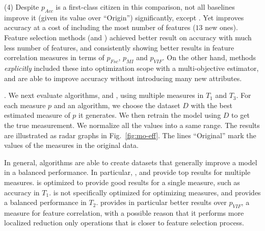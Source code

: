 {\sstab
(4) Despite $p_{Acc}$ is a first-class citizen 
in this comparison, not all baselines improve 
it (given its value over ``Origin'') significantly, except \starmie.   
Yet \starmie improves accuracy at a cost of 
including the most number of 
features ($13$ new ones). Feature selection 
methods (\sklearn and \ho) achieved better 
result on accuracy with much less number of 
features, and consistently showing better 
results in feature correlation measures 
in terms of $p_{Fsc}$, $p_{MI}$ and $p_{VIF}$. 
On the other hand, \modis methods 
{\em explicitly} included these into optimization 
scope with a multi-objective estimator, 
and are able to improve accuracy without 
introducing many new attributes. 




. 
We next evaluate \modis algorithms, \metam and \starmie, using multiple measures in $T_1$ and $T_3$. For each measure $p$ and an  
algorithm, we choose the dataset $D$
with the best estimated measure of $p$ it generates. 
We then retrain the model using $D$ 
to get the true measurement. 
We normalize all the values into 
a same range. 
The results are illustrated as radar graphs in Fig.~\ref{fig:mo-eff}. 
The lines ``Original'' 
mark the values of the 
measures in the original data. 

In general, \modis algorithms are able to create  
datasets that generally improve a model in a balanced performance. In particular, \bimodis, \divmodis and 
\nomodis provide top results for multiple measures. \metam 
is optimized to provide good results for a single 
measure, such as accuracy in $T_1$. \starmie 
is not specifically optimized for 
optimizing measures, and provides a balanced 
performance in $T_2$. \apxmodis provides 
in particular better results over $p_{VIF}$, 
a measure for feature correlation, with a possible 
reason that it performs more localized 
reduction only operations that is closer to 
feature selection process. 
}


